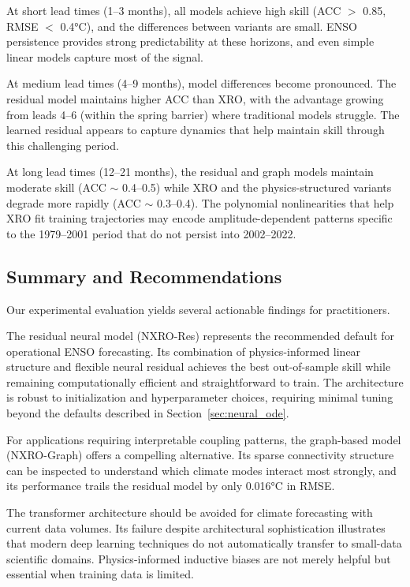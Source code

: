 At short lead times (1--3 months), all models achieve high skill (ACC $>$ 0.85, RMSE $<$ 0.4°C), and the differences between variants are small. ENSO persistence provides strong predictability at these horizons, and even simple linear models capture most of the signal.

At medium lead times (4--9 months), model differences become pronounced. The residual model maintains higher ACC than XRO, with the advantage growing from leads 4--6 (within the spring barrier) where traditional models struggle. The learned residual appears to capture dynamics that help maintain skill through this challenging period.

At long lead times (12--21 months), the residual and graph models maintain moderate skill (ACC $\sim$ 0.4--0.5) while XRO and the physics-structured variants degrade more rapidly (ACC $\sim$ 0.3--0.4). The polynomial nonlinearities that help XRO fit training trajectories may encode amplitude-dependent patterns specific to the 1979--2001 period that do not persist into 2002--2022.

\subsection{Summary and Recommendations}

Our experimental evaluation yields several actionable findings for practitioners.

The residual neural model (NXRO-Res) represents the recommended default for operational ENSO forecasting. Its combination of physics-informed linear structure and flexible neural residual achieves the best out-of-sample skill while remaining computationally efficient and straightforward to train. The architecture is robust to initialization and hyperparameter choices, requiring minimal tuning beyond the defaults described in Section~\ref{sec:neural_ode}.

For applications requiring interpretable coupling patterns, the graph-based model (NXRO-Graph) offers a compelling alternative. Its sparse connectivity structure can be inspected to understand which climate modes interact most strongly, and its performance trails the residual model by only 0.016°C in RMSE.

The transformer architecture should be avoided for climate forecasting with current data volumes. Its failure despite architectural sophistication illustrates that modern deep learning techniques do not automatically transfer to small-data scientific domains. Physics-informed inductive biases are not merely helpful but essential when training data is limited.

